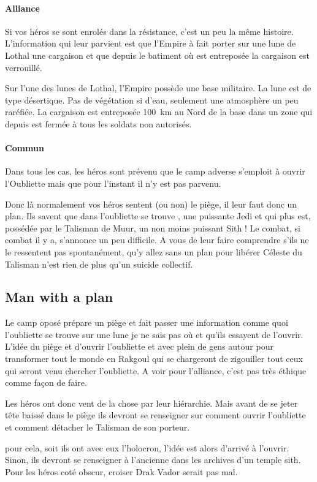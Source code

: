\paragraph{Alliance}
Si vos héros se sont enrolés dans la résistance, c’est un peu la même histoire. L’information qui leur parvient est que l’Empire à fait porter sur une lune de Lothal une cargaison et que depuis le batiment où est entreposée la cargaison est verrouillé. 

Sur l’une des lunes de Lothal, l’Empire possède une base militaire. La lune est de type désertique. Pas de végétation si d’eau, seulement une atmosphère un peu raréfiée. La cargaison est entreposée 100~km au Nord de la base dans un zone qui depuis est fermée à tous les soldats non autorisés.

\paragraph{Commun}
Dans tous les cas, les héros sont prévenu que le camp adverse s’emploit à ouvrir l’Oubliette mais que pour l’instant il n’y est pas parvenu.

Donc là normalement vos héros sentent (ou non) le piège, il leur faut donc un plan. Ils savent que dans l’oubliette se trouve , une puissante Jedi et qui plus est, possédée par le Talisman de Muur, un non moins puissant Sith ! Le combat, si combat il y a, s'annonce un peu difficile. A vous de leur faire comprendre s’ils ne le ressentent pas spontanément, qu’y allez sans un plan pour libérer Céleste du Talisman n’est rien de plus qu’un suicide collectif.

\subsection{Man with a plan}
Le camp oposé prépare un piège et fait passer une information comme quoi l’oubliette se trouve sur une lune je ne sais pas où et qu'ils essayent de l’ouvrir. L’idée du piège et d’ouvrir l’oubliette et avec plein de gens autour pour transformer tout le monde en Rakgoul qui se chargeront de zigouiller tout ceux qui seront venu chercher l’oubliette.
A voir pour l’alliance, c'est pas très éthique comme façon de faire.

Les héros ont donc vent de la chose par leur hiérarchie. Mais avant de se jeter tête baissé dans le piège ils devront se renseigner sur comment ouvrir l'oubliette et comment détacher le Talisman de son porteur.

pour cela, soit ils ont avec eux l'holocron, l'idée est alors d'arrivé à l'ouvrir. Sinon, ils devront se renseigner à l'ancienne dans les archives d'un temple sith. Pour les héros coté obscur, croiser Drak Vador serait pas mal.

